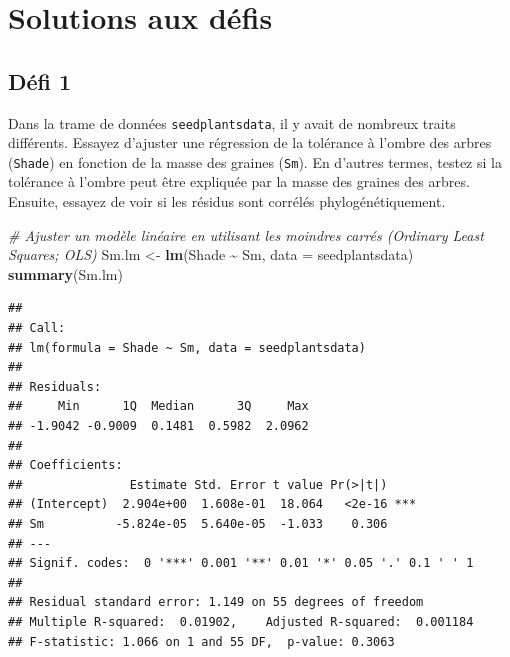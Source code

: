 \documentclass[
]{book}
\newenvironment{Shaded}{\begin{snugshade}}{\end{snugshade}}
\newcommand{\AttributeTok}[1]{\textcolor[rgb]{0.13,0.29,0.53}{#1}}
\newcommand{\CommentTok}[1]{\textcolor[rgb]{0.56,0.35,0.01}{\textit{#1}}}
\newcommand{\FunctionTok}[1]{\textcolor[rgb]{0.13,0.29,0.53}{\textbf{#1}}}
\newcommand{\NormalTok}[1]{#1}
\newcommand{\OtherTok}[1]{\textcolor[rgb]{0.56,0.35,0.01}{#1}}
\newcommand{\SpecialCharTok}[1]{\textcolor[rgb]{0.81,0.36,0.00}{\textbf{#1}}}
\begin{document}
\chapter{Solutions aux défis}\label{solutions}

\section{Défi 1}\label{duxe9fi-1}

Dans la trame de données \texttt{seedplantsdata}, il y avait de nombreux traits différents. Essayez d'ajuster une régression de la tolérance à l'ombre des arbres (\texttt{Shade}) en fonction de la masse des graines (\texttt{Sm}). En d'autres termes, testez si la tolérance à l'ombre peut être expliquée par la masse des graines des arbres. Ensuite, essayez de voir si les résidus sont corrélés phylogénétiquement.

\begin{Shaded}
\begin{Highlighting}[]
\CommentTok{\# Ajuster un modèle linéaire en utilisant les moindres carrés (Ordinary Least Squares; OLS)}
\NormalTok{Sm.lm }\OtherTok{\textless{}{-}} \FunctionTok{lm}\NormalTok{(Shade }\SpecialCharTok{\textasciitilde{}}\NormalTok{ Sm, }\AttributeTok{data =}\NormalTok{ seedplantsdata)}
\FunctionTok{summary}\NormalTok{(Sm.lm)}
\end{Highlighting}
\end{Shaded}

\begin{verbatim}
## 
## Call:
## lm(formula = Shade ~ Sm, data = seedplantsdata)
## 
## Residuals:
##     Min      1Q  Median      3Q     Max 
## -1.9042 -0.9009  0.1481  0.5982  2.0962 
## 
## Coefficients:
##               Estimate Std. Error t value Pr(>|t|)    
## (Intercept)  2.904e+00  1.608e-01  18.064   <2e-16 ***
## Sm          -5.824e-05  5.640e-05  -1.033    0.306    
## ---
## Signif. codes:  0 '***' 0.001 '**' 0.01 '*' 0.05 '.' 0.1 ' ' 1
## 
## Residual standard error: 1.149 on 55 degrees of freedom
## Multiple R-squared:  0.01902,    Adjusted R-squared:  0.001184 
## F-statistic: 1.066 on 1 and 55 DF,  p-value: 0.3063
\end{verbatim}
\end{document}
